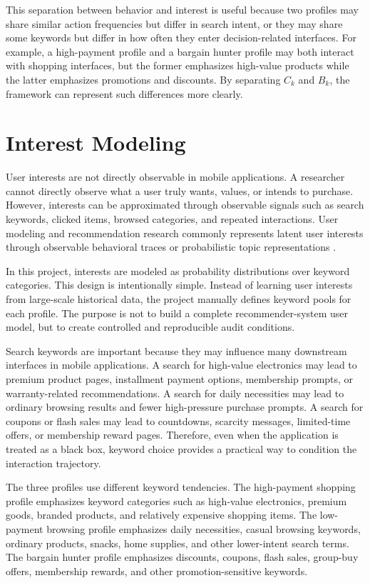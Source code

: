 This separation between behavior and interest is useful because two profiles may share similar action frequencies but differ in search intent, or they may share some keywords but differ in how often they enter decision-related interfaces. For example, a high-payment profile and a bargain hunter profile may both interact with shopping interfaces, but the former emphasizes high-value products while the latter emphasizes promotions and discounts. By separating \(C_k\) and \(B_k\), the framework can represent such differences more clearly.

\section{Interest Modeling}

User interests are not directly observable in mobile applications. A researcher cannot directly observe what a user truly wants, values, or intends to purchase. However, interests can be approximated through observable signals such as search keywords, clicked items, browsed categories, and repeated interactions. User modeling and recommendation research commonly represents latent user interests through observable behavioral traces or probabilistic topic representations \cite{blei2003lda,piao2018interests,zhou2018din}.

In this project, interests are modeled as probability distributions over keyword categories. This design is intentionally simple. Instead of learning user interests from large-scale historical data, the project manually defines keyword pools for each profile. The purpose is not to build a complete recommender-system user model, but to create controlled and reproducible audit conditions.

Search keywords are important because they may influence many downstream interfaces in mobile applications. A search for high-value electronics may lead to premium product pages, installment payment options, membership prompts, or warranty-related recommendations. A search for daily necessities may lead to ordinary browsing results and fewer high-pressure purchase prompts. A search for coupons or flash sales may lead to countdowns, scarcity messages, limited-time offers, or membership reward pages. Therefore, even when the application is treated as a black box, keyword choice provides a practical way to condition the interaction trajectory.

The three profiles use different keyword tendencies. The high-payment shopping profile emphasizes keyword categories such as high-value electronics, premium goods, branded products, and relatively expensive shopping items. The low-payment browsing profile emphasizes daily necessities, casual browsing keywords, ordinary products, snacks, home supplies, and other lower-intent search terms. The bargain hunter profile emphasizes discounts, coupons, flash sales, group-buy offers, membership rewards, and other promotion-sensitive keywords.

